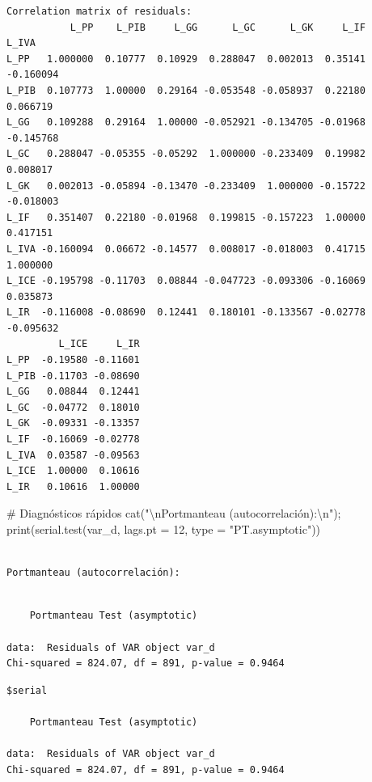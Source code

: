 \documentclass[
  spanish,
  letterpaper,
  DIV=11,
  numbers=noendperiod]{scrartcl}
\newenvironment{Shaded}{\begin{snugshade}}{\end{snugshade}}
\newcommand{\AttributeTok}[1]{\textcolor[rgb]{0.40,0.45,0.13}{#1}}
\newcommand{\CommentTok}[1]{\textcolor[rgb]{0.37,0.37,0.37}{#1}}
\newcommand{\DecValTok}[1]{\textcolor[rgb]{0.68,0.00,0.00}{#1}}
\newcommand{\FunctionTok}[1]{\textcolor[rgb]{0.28,0.35,0.67}{#1}}
\newcommand{\NormalTok}[1]{\textcolor[rgb]{0.00,0.23,0.31}{#1}}
\newcommand{\SpecialCharTok}[1]{\textcolor[rgb]{0.37,0.37,0.37}{#1}}
\newcommand{\StringTok}[1]{\textcolor[rgb]{0.13,0.47,0.30}{#1}}
\begin{document}
\begin{verbatim}
Correlation matrix of residuals:
           L_PP    L_PIB     L_GG      L_GC      L_GK     L_IF     L_IVA
L_PP   1.000000  0.10777  0.10929  0.288047  0.002013  0.35141 -0.160094
L_PIB  0.107773  1.00000  0.29164 -0.053548 -0.058937  0.22180  0.066719
L_GG   0.109288  0.29164  1.00000 -0.052921 -0.134705 -0.01968 -0.145768
L_GC   0.288047 -0.05355 -0.05292  1.000000 -0.233409  0.19982  0.008017
L_GK   0.002013 -0.05894 -0.13470 -0.233409  1.000000 -0.15722 -0.018003
L_IF   0.351407  0.22180 -0.01968  0.199815 -0.157223  1.00000  0.417151
L_IVA -0.160094  0.06672 -0.14577  0.008017 -0.018003  0.41715  1.000000
L_ICE -0.195798 -0.11703  0.08844 -0.047723 -0.093306 -0.16069  0.035873
L_IR  -0.116008 -0.08690  0.12441  0.180101 -0.133567 -0.02778 -0.095632
         L_ICE     L_IR
L_PP  -0.19580 -0.11601
L_PIB -0.11703 -0.08690
L_GG   0.08844  0.12441
L_GC  -0.04772  0.18010
L_GK  -0.09331 -0.13357
L_IF  -0.16069 -0.02778
L_IVA  0.03587 -0.09563
L_ICE  1.00000  0.10616
L_IR   0.10616  1.00000
\end{verbatim}

\begin{Shaded}
\begin{Highlighting}[]
\CommentTok{\# Diagnósticos rápidos}
\FunctionTok{cat}\NormalTok{(}\StringTok{"}\SpecialCharTok{\textbackslash{}n}\StringTok{Portmanteau (autocorrelación):}\SpecialCharTok{\textbackslash{}n}\StringTok{"}\NormalTok{); }\FunctionTok{print}\NormalTok{(}\FunctionTok{serial.test}\NormalTok{(var\_d, }\AttributeTok{lags.pt =} \DecValTok{12}\NormalTok{, }\AttributeTok{type =} \StringTok{"PT.asymptotic"}\NormalTok{))}
\end{Highlighting}
\end{Shaded}

\begin{verbatim}

Portmanteau (autocorrelación):
\end{verbatim}

\begin{verbatim}

    Portmanteau Test (asymptotic)

data:  Residuals of VAR object var_d
Chi-squared = 824.07, df = 891, p-value = 0.9464
\end{verbatim}

\begin{verbatim}
$serial

    Portmanteau Test (asymptotic)

data:  Residuals of VAR object var_d
Chi-squared = 824.07, df = 891, p-value = 0.9464
\end{verbatim}
\end{document}
